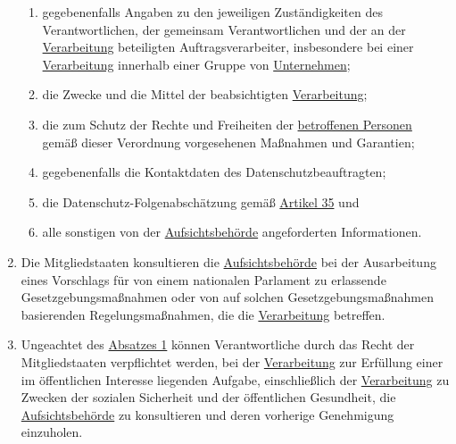 \begin{enumerate}
\begin{enumerate}
    \item gegebenenfalls Angaben zu den jeweiligen Zuständigkeiten des Verantwortlichen, der gemeinsam Verantwortlichen
     und der an der \hyperref[itm:04-2]{Verarbeitung} beteiligten Auftragsverarbeiter, insbesondere bei einer \hyperref[itm:04-2]{Verarbeitung} innerhalb einer
     Gruppe von \hyperref[itm:04-18]{Unternehmen};
    \label{itm:36-3a}

    \item die Zwecke und die Mittel der beabsichtigten \hyperref[itm:04-2]{Verarbeitung};
    \label{itm:36-3b}

    \item die zum Schutz der Rechte und Freiheiten der \hyperref[itm:04-1]{betroffenen Personen} gemäß dieser Verordnung vorgesehenen
     Maßnahmen und Garantien;
    \label{itm:36-3c}

    \item gegebenenfalls die Kontaktdaten des Datenschutzbeauftragten;
    \label{itm:36-3d}

    \item die Datenschutz-Folgenabschätzung gemäß \hyperref[ch:35]{Artikel 35} und
    \label{itm:36-3e}

    \item alle sonstigen von der \hyperref[itm:04-21]{Aufsichtsbehörde} angeforderten Informationen.
    \label{itm:36-3f}

  \end{enumerate}

  \item Die Mitgliedstaaten konsultieren die \hyperref[itm:04-21]{Aufsichtsbehörde} bei der Ausarbeitung eines Vorschlags für von einem
   nationalen Parlament zu erlassende Gesetzgebungsmaßnahmen oder von auf solchen Gesetzgebungsmaßnahmen basierenden
   Regelungsmaßnahmen, die die \hyperref[itm:04-2]{Verarbeitung} betreffen.
  \label{itm:36-4}

  \item Ungeachtet des \hyperref[itm:36-1]{Absatzes 1} können Verantwortliche durch das Recht der Mitgliedstaaten
   verpflichtet werden, bei der \hyperref[itm:04-2]{Verarbeitung} zur Erfüllung einer im öffentlichen Interesse liegenden Aufgabe,
   einschließlich der \hyperref[itm:04-2]{Verarbeitung} zu Zwecken der sozialen Sicherheit und der öffentlichen Gesundheit, die
   \hyperref[itm:04-21]{Aufsichtsbehörde} zu konsultieren und deren vorherige Genehmigung einzuholen.
  \label{itm:36-5}
   
\end{enumerate}


